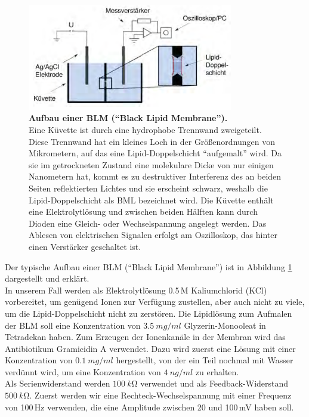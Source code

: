 \documentclass[a4paper,ngerman]{scrartcl}
\begin{document}
\begin{figure}[tb!]
  \centering
  \includegraphics[width=0.8\textwidth]{abbildungen/blmaufbau.png}
  \caption{\textbf{Aufbau einer BLM ("`Black Lipid Membrane"').} \\Eine Küvette ist durch eine hydrophobe Trennwand zweigeteilt. Diese Trennwand hat ein kleines Loch in der Größenordnungen von Mikrometern, auf das eine Lipid-Doppelschicht "`aufgemalt"' wird. Da sie im getrockneten Zustand eine molekulare Dicke von nur einigen Nanometern hat, kommt es zu destruktiver Interferenz des an beiden Seiten reflektierten Lichtes und sie erscheint schwarz, weshalb die Lipid-Doppelschicht als BML bezeichnet wird. Die Küvette enthält eine Elektrolytlösung und zwischen beiden Hälften kann durch Dioden eine Gleich- oder Wechselspannung angelegt werden. Das Ablesen von elektrischen Signalen erfolgt am Oszilloskop, das hinter einen Verstärker geschaltet ist.}
  \label{fig:blmaufbau}
\end{figure}

Der typische Aufbau einer BLM ("`Black Lipid Membrane"') ist in Abbildung \ref{fig:blmaufbau} dargestellt und erklärt. \\

In unserem Fall werden als Elektrolytlösung 0.5\,M Kaliumchlorid (KCl) vorbereitet, um genügend Ionen zur Verfügung zustellen, aber auch nicht zu viele, um die Lipid-Doppelschicht nicht zu zerstören. Die Lipidlösung zum Aufmalen der BLM soll eine Konzentration von 
$\SI{3,5}{mg/ml}$ Glyzerin-Monooleat in Tetradekan haben. Zum Erzeugen der Ionenkanäle in der Membran wird das Antibiotikum Gramicidin A verwendet. Dazu wird zuerst eine
Lösung mit einer Konzentration von $\SI{0,1}{mg/ml}$ hergestellt, von der ein Teil nochmal mit Wasser verdünnt wird, um eine Konzentration von
$\SI{4}{ng/ml}$ zu erhalten. \\

Als Serienwiderstand werden $\SI{100}{k\ohm}$ verwendet und als Feedback-Widerstand $\SI{500}{k\ohm}$. Zuerst werden wir eine 
Rechteck-Wechselspannung mit einer Frequenz von 100\,Hz verwenden, die eine Amplitude zwischen 20 und 100\,mV haben soll. \\
\end{document}
